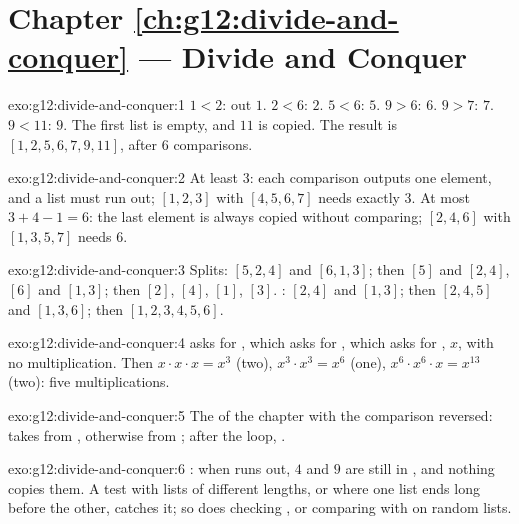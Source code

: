 \section*{Chapter \ref{ch:g12:divide-and-conquer} --- Divide and Conquer}

\begin{solution}{exo:g12:divide-and-conquer:1}
$1 < 2$: out $1$. $2 < 6$: $2$. $5 < 6$: $5$. $9 > 6$: $6$. $9 > 7$: $7$. $9 < 11$: $9$. The first list is empty, and
$11$ is copied. The result is $[1, 2, 5, 6, 7, 9, 11]$, after $6$ comparisons.
\end{solution}

\begin{solution}{exo:g12:divide-and-conquer:2}
At least $3$: each comparison outputs one element, and a list must run out; $[1, 2, 3]$ with $[4, 5, 6, 7]$ needs
exactly $3$. At most $3 + 4 - 1 = 6$: the last element is always copied without comparing; $[2, 4, 6]$ with
$[1, 3, 5, 7]$ needs $6$.
\end{solution}

\begin{solution}{exo:g12:divide-and-conquer:3}
Splits: $[5, 2, 4]$ and $[6, 1, 3]$; then $[5]$ and $[2, 4]$, $[6]$ and $[1, 3]$; then $[2]$, $[4]$, $[1]$, $[3]$.
: $[2, 4]$ and $[1, 3]$; then $[2, 4, 5]$ and $[1, 3, 6]$; then $[1, 2, 3, 4, 5, 6]$.
\end{solution}

\begin{solution}{exo:g12:divide-and-conquer:4}
 asks for , which asks for , which asks for
, $x$, with no multiplication. Then $x \cdot x \cdot x = x^3$ (two), $x^3 \cdot x^3 = x^6$ (one),
$x^6 \cdot x^6 \cdot x = x^{13}$ (two): five multiplications.
\end{solution}

\begin{solution}{exo:g12:divide-and-conquer:5}
The  of the chapter with the comparison reversed:  takes from , otherwise from
; after the loop, .
\end{solution}

\begin{solution}{exo:g12:divide-and-conquer:6}
\code{[1, 2, 3]}: when  runs out, $4$ and $9$ are still in , and nothing copies them. A test with
lists of different lengths, or where one list ends long before the other, catches it; so does checking
, or comparing with  on random lists.
\end{solution}


